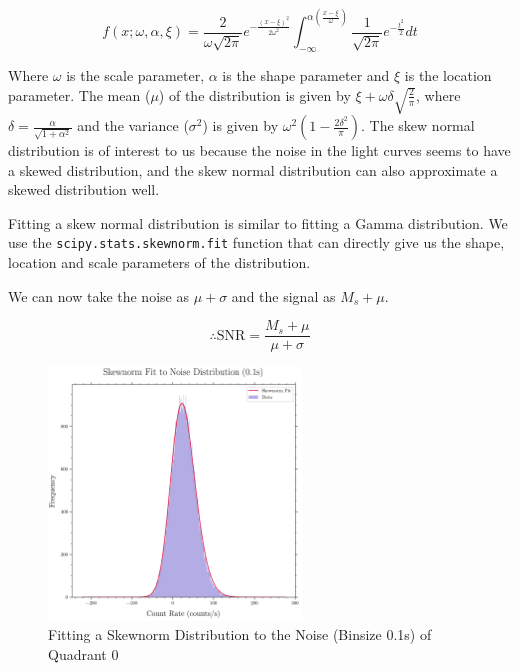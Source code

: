 \documentclass[11pt]{book} %
\begin{document}
\begin{equation} \label{eq:skewnorm}
    f(x; \omega, \alpha, \xi) = \dfrac{2}{\omega \sqrt{2 \pi}} e^{-\frac{(x-\xi)^2}{2\omega^2}} \int_{-\infty}^{\alpha \left(\frac{x-\xi}{\omega} \right)} \dfrac{1}{\sqrt{2 \pi}} e^{-\frac{t^2}{2}} dt
\end{equation}

Where $\omega$ is the scale parameter, $\alpha$ is the shape parameter and $\xi$ is the location parameter. The mean ($\mu$) of the distribution is given by $\xi + \omega \delta \sqrt{\frac{2}{\pi}}$, where $\delta = \frac{\alpha}{\sqrt{1+\alpha^2}}$ and the variance ($\sigma^2$) is given by $\omega^2 \left( 1 - \frac{2 \delta^2}{\pi} \right)$. The skew normal distribution is of interest to us because the noise in the light curves seems to have a skewed distribution, and the skew normal distribution can also approximate a skewed distribution well.

Fitting a skew normal distribution is similar to fitting a Gamma distribution. We use the \lstinline[language=Python]{scipy.stats.skewnorm.fit} function that can directly give us the shape, location and scale parameters of the distribution.

We can now take the noise as $\mu+\sigma$ and the signal as $M_s+\mu$.

\begin{equation}
    \therefore \text{SNR} = \frac{M_s+\mu}{\mu+\sigma}
\end{equation}

\begin{figure}[H]
    \centering
    \includegraphics[width=0.6\textwidth]{Pictures/skewnorm_fit.png}
    \caption{Fitting a Skewnorm Distribution to the Noise (Binsize 0.1s) of Quadrant 0}
\end{figure}
\end{document}
